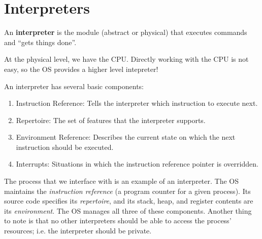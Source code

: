 \documentclass{report}
\begin{document}
\section{Interpreters}

\begin{tcolorbox}[title=Definition: Persistent and Transient Memory]
  An \textbf{interpreter} is the module (abstract or physical) that executes commands and ``gets
  things done''.
\end{tcolorbox}

\begin{tcolorbox}[colback=violet!5!white,colframe=violet,title=Abstraction: Interpreters] 
  At the physical level, we have the CPU. Directly working with the CPU is not easy, so the OS
  provides a higher level intepreter!
\end{tcolorbox}

An interpreter has several basic components: 
\begin{enumerate}[label=\textit{(\roman*)}]
\item Instruction Reference: Tells the interpreter which instruction to execute next.
\item Repertoire: The set of features that the interpreter supports.
\item Environment Reference: Describes the current state on which the next instruction should be
  executed.
\item Interrupts: Situations in which the instruction reference pointer is overridden.
\end{enumerate}

\begin{tcolorbox}[colback=blue!5!white,colframe=black!75!blue,title=Example: Processing Processes] 
  The process that we interface with is an example of an interpreter. The OS maintains the
  \textit{instruction reference} (a program counter for a given process). Its source code specifies
  its \textit{repertoire}, and its stack, heap, and register contents are its
  \textit{environment}. The OS manages all three of these components. Another thing to note is that
  no other interpreters should be able to access the process' resources; i.e. the interpreter should
  be private.
\end{tcolorbox}
\end{document}
